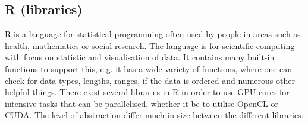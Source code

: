 \subsection{R (libraries)}
R is a language for statistical programming often used by people in areas such as health, mathematics or social research.
The language is for scientific computing with focus on statistic and visualisation of data.
It contains many built-in functions to support this, e.g. it has a wide variety of functions, where one can check for data types, lengths, ranges, if the data is ordered and numerous other helpful things.
There exist several libraries in R in order to use GPU cores for intensive tasks that can be parallelised, whether it be to utilise OpenCL or CUDA. 
The level of abstraction differ much in size between the different libraries. 
\citep{R_history,R_speed}

                            
